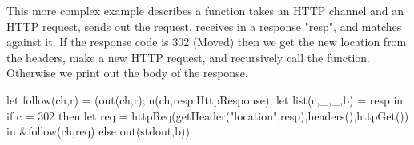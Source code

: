 This more complex example describes a function takes an HTTP channel and an HTTP request, sends out the request, receives in a response "resp", and matches against it. If the response code is 302 (Moved) then we get the new location from the headers, make a new HTTP request, and recursively call the function. Otherwise we print out the body of the response.
\begin{code}
let follow(ch,r) = (out(ch,r);in(ch,resp:HttpResponse);
    let list(c,_,_,b) = resp in
        if c = 302 
            then let req = httpReq(getHeader("location",resp),headers(),httpGet()) in 
                &follow(ch,req) 
            else out(stdout,b)) 
\end{code}
